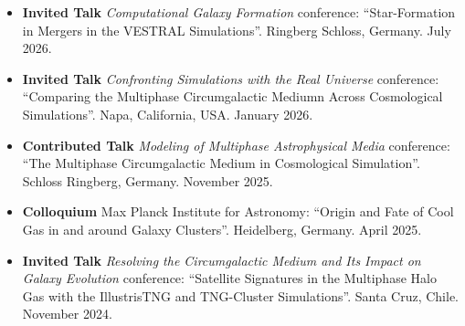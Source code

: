 \documentclass[a4paper,12pt,oneside]{article}
\begin{document}
\begin{itemize}[wide, labelwidth=!, labelindent=-11pt, noitemsep]
    \item {\bf Invited Talk} {\it Computational Galaxy Formation} conference: ``Star-Formation in Mergers in the VESTRAL Simulations''. Ringberg Schloss, Germany. July 2026.
    \item {\bf Invited Talk} {\it Confronting Simulations with the Real Universe} conference: ``Comparing the Multiphase Circumgalactic Mediumn Across Cosmological Simulations''. Napa, California, USA. January 2026.
    \item {\bf Contributed Talk} {\it Modeling of Multiphase Astrophysical Media} conference: ``The Multiphase Circumgalactic Medium in Cosmological Simulation''. Schloss Ringberg, Germany. November 2025.
    \item {\bf Colloquium} Max Planck Institute for Astronomy: ``Origin and Fate of Cool Gas in and around Galaxy Clusters''. Heidelberg, Germany. April 2025.
    \item {\bf Invited Talk}  {\it Resolving the Circumgalactic Medium and Its Impact on Galaxy Evolution} conference: ``Satellite Signatures in the Multiphase Halo Gas with the IllustrisTNG and TNG-Cluster Simulations''. Santa Cruz, Chile. November 2024.

\end{itemize}
\end{document}
